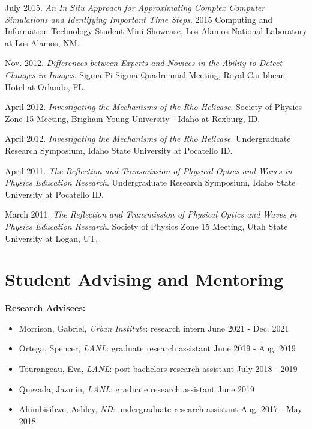 \documentclass[11pt, letterpaper, roman]{moderncv} %
\begin{document}
\begin{etaremune}[topsep=0pt, itemsep=0.75pt, partopsep=0pt, parsep=0pt]
    \item July 2015. \textit{An In Situ Approach for Approximating Complex Computer Simulations and Identifying Important Time Steps}. 2015 Computing and Information Technology Student Mini Showcase, Los Alamos National Laboratory at Los Alamos, NM.
    
    \item Nov. 2012. \textit{Differences between Experts and Novices in the Ability to Detect Changes in Images}. Sigma Pi Sigma Quadrennial Meeting, Royal Caribbean Hotel at Orlando, FL.
    
    \item April 2012. \textit{Investigating the Mechanisms of the Rho Helicase}. Society of Physics Zone 15 Meeting, Brigham Young University - Idaho at Rexburg, ID.
    
    \item April 2012. \textit{Investigating the Mechanisms of the Rho Helicase}. Undergraduate Research Symposium, Idaho State University at Pocatello ID.
    
    \item April 2011. \textit{The Reflection and Transmission of Physical Optics and Waves in Physics Education Research}. Undergraduate Research Symposium, Idaho State University at Pocatello ID.
    
    \item March 2011. \textit{The Reflection and Transmission of Physical Optics and Waves in Physics Education Research}. Society of Physics Zone 15 Meeting, Utah State University at Logan, UT.
\end{etaremune}


\newpage
\section{Student Advising and Mentoring}

\underline{\textbf{\large Research Advisees:}}\normalsize

    \begin{itemize}
        \item Morrison, Gabriel, \textit{Urban Institute}: research intern \hfill June 2021 - Dec. 2021
        \item Ortega, Spencer, \textit{LANL}: graduate research assistant \hfill June 2019 - Aug. 2019
        \item Tourangeau, Eva, \textit{LANL}: post bachelors research assistant \hfill July 2018 - 2019
        \item Quezada, Jazmin, \textit{LANL}: graduate research assistant \hfill June 2019
        \item Ahimbisibwe, Ashley, \textit{ND}: undergraduate research assistant \hfill Aug. 2017 - May 2018
    \end{itemize}
\end{document}
